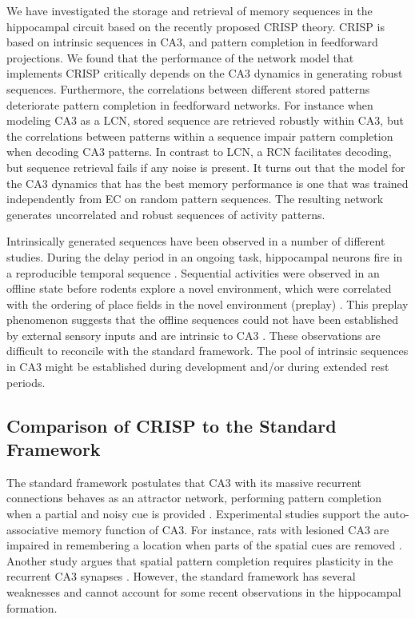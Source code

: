 \documentclass[utf8]{frontiersSCNS} %
\begin{document}
We have investigated the storage and retrieval of memory sequences in the hippocampal circuit based on the recently proposed CRISP theory. CRISP is based on intrinsic sequences in CA3, and pattern completion in feedforward projections. We found that the performance of the network model that implements CRISP critically depends on the CA3 dynamics in generating robust sequences. Furthermore, the correlations between different stored patterns deteriorate pattern completion in feedforward networks. For instance when modeling CA3 as a LCN, stored sequence are retrieved robustly within CA3, but the  correlations between patterns within a sequence impair pattern completion when decoding CA3 patterns. In contrast to LCN, a RCN facilitates decoding, but sequence retrieval fails if any noise is present. It turns out that the model for the CA3 dynamics that has the best memory performance is one that was trained independently from EC on random pattern sequences. The resulting network generates uncorrelated and robust sequences of activity patterns. 


Intrinsically generated sequences have been observed in a number of different studies. During the delay period in an ongoing task, hippocampal neurons fire in a reproducible temporal sequence \cite{pastalkova2008internally, macdonald2011hippocampal}.  Sequential activities were observed in an offline state before rodents explore a novel environment, which were correlated with the ordering of place fields in the novel environment (preplay) \cite{dragoi2011preplay}. This preplay phenomenon suggests that the offline sequences could not have been established by external sensory inputs and are intrinsic to CA3 \cite{azizi2013computational}. These observations are difficult to reconcile with the standard framework. The pool of intrinsic sequences in CA3 might be established during development and/or during extended rest periods.  


\subsection{Comparison of CRISP to the Standard Framework}

The standard framework postulates that CA3 with its massive recurrent connections behaves as an attractor network, performing pattern completion when a partial and noisy cue is provided \cite{mcnaughton1987hippocampal, rolls2007attractor}. Experimental studies support the auto-associative memory function of CA3. For instance, rats with lesioned CA3 are impaired in remembering a location when parts of the spatial cues are removed \cite{gold2005role}. Another study argues that spatial pattern completion requires plasticity in the recurrent CA3 synapses \cite{nakazawa2002requirement}. However, the standard framework has several weaknesses and cannot account for some recent observations in the hippocampal formation. 
\end{document}
